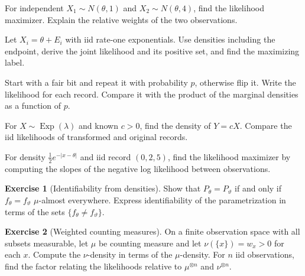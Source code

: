 \documentclass[11pt,oneside]{book}
\theoremstyle{definition}
\newtheorem{exercise}{Exercise}[section]
\theoremstyle{remark}
\begin{document}
\begin{practiceexercise}
\label{wex:precision-weighted-location}
For independent $X_1\sim N(\theta,1)$ and $X_2\sim N(\theta,4)$, find the
likelihood maximizer. Explain the relative weights of the two observations.
\end{practiceexercise}

\begin{practiceexercise}
\label{wex:shifted-exponential-likelihood}
Let $X_i=\theta+E_i$ with iid rate-one exponentials. Use densities including
the endpoint, derive the joint likelihood and its positive set, and find the
maximizing label.
\end{practiceexercise}

\begin{practiceexercise}
\label{wex:dependent-binary-joint-likelihood}
Start with a fair bit and repeat it with probability $p$, otherwise flip it.
Write the likelihood for each record. Compare it with the product of the
marginal densities as a function of $p$.
\end{practiceexercise}

\begin{practiceexercise}
\label{wex:exponential-units}
For $X\sim\operatorname{Exp}(\lambda)$ and known $c>0$, find the density of
$Y=cX$. Compare the iid likelihoods of transformed and original records.
\end{practiceexercise}

\begin{practiceexercise}
\label{wex:two-sided-location-likelihood}
For density $\tfrac12e^{-|x-\theta|}$ and iid record $(0,2,5)$, find the
likelihood maximizer by computing the slopes of the negative log likelihood
between observations.
\end{practiceexercise}

\begin{exercise}[Identifiability from densities]
\label{exer:identifiability-densities}
Show that $P_\theta=P_\vartheta$ if and only if
$f_\theta=f_\vartheta$ $\mu$-almost everywhere. Express identifiability of
the parametrization in terms of the sets $\{f_\theta\ne f_\vartheta\}$.
\end{exercise}

\begin{exercise}[Weighted counting measures]
\label{exer:weighted-counting-likelihood}
On a finite observation space with all subsets measurable, let $\mu$ be
counting measure and let $\nu(\{x\})=w_x>0$ for each $x$. Compute the
$\nu$-density in terms of the
$\mu$-density. For $n$ iid observations, find the factor relating the
likelihoods relative to $\mu^{\otimes n}$ and $\nu^{\otimes n}$.
\end{exercise}
\end{document}
